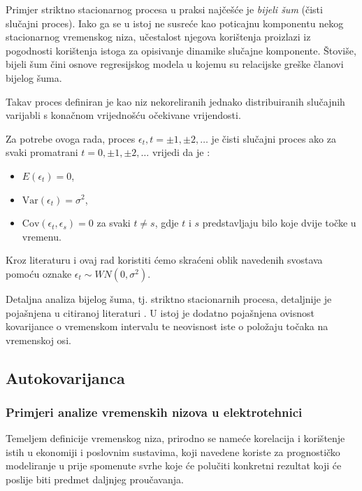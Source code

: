 \documentclass[a4paper,12pt,oneside]{memoir}
\begin{document}
            Primjer striktno stacionarnog procesa u praksi najčešće je \textit{bijeli šum} (čisti slučajni proces). Iako ga se u istoj ne susreće kao poticajnu komponentu nekog stacionarnog vremenskog niza, učestalost njegova korištenja proizlazi iz pogodnosti korištenja istoga za opisivanje dinamike slučajne komponente. Štoviše, bijeli šum čini osnove regresijskog modela u kojemu su relacijske greške članovi bijelog šuma.
            
            Takav proces definiran je kao niz nekoreliranih jednako distribuiranih slučajnih varijabli s konačnom vrijednošću očekivane vrijendosti.

            Za potrebe ovoga rada, proces ${\epsilon_t, t=\pm 1, \pm 2, \ldots}$ je čisti slučajni proces ako za svaki promatrani $t=0,\pm 1, \pm 2,\ldots$ vrijedi da je \cite{Bahovec}:

            \begin{itemize}
                \item $E(\epsilon_t)=0$,
                \item $\mathrm{Var}(\epsilon_t)=\sigma^2$,
                \item $\mathrm{Cov}(\epsilon_t,\epsilon_s)=0$ za svaki $t\neq s$, gdje $t$ i $s$ predstavljaju bilo koje dvije točke u vremenu.
            \end{itemize}

            Kroz literaturu i ovaj rad koristiti ćemo skraćeni oblik navedenih svostava pomoću oznake $\epsilon_t\sim WN(0,\sigma^2)$.

            Detaljna analiza bijelog šuma, tj. striktno stacionarnih procesa, detaljnije je pojašnjena u citiranoj literaturi \cite{Priestley}\cite{Bahovec}. U istoj je dodatno pojašnjena ovisnost kovarijance o vremenskom intervalu te neovisnost iste o položaju točaka na vremenskoj osi.

            \subsection{Autokovarijanca}

            \subsubsection{Primjeri analize vremenskih nizova u elektrotehnici}
                Temeljem definicije vremenskog niza, prirodno se nameće korelacija i korištenje istih u ekonomiji i poslovnim sustavima, koji navedene koriste za prognostičko modeliranje u prije spomenute svrhe koje će polučiti konkretni rezultat koji će poslije biti predmet daljnjeg proučavanja.
\end{document}
